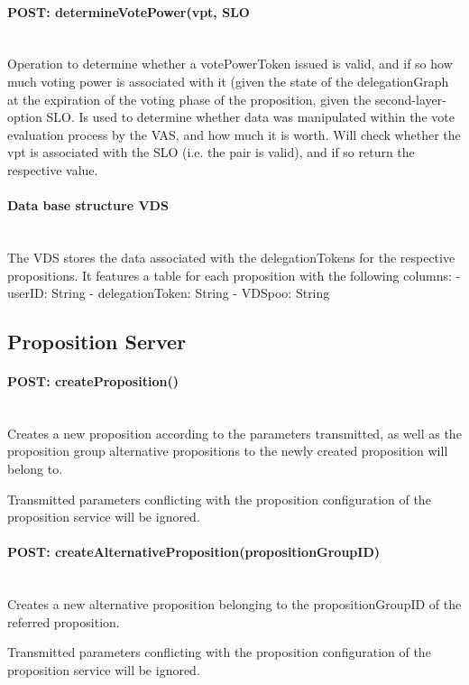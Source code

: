 \paragraph*{POST: determineVotePower(vpt, SLO} \mbox{} \\
Operation to determine whether a votePowerToken issued is valid, and if so how much voting power is associated with it (given the state of the delegationGraph at the expiration of the voting phase of the proposition, given the second-layer-option SLO. Is used to determine whether data was manipulated within the vote evaluation process by the VAS, and how much it is worth. Will check whether the vpt is associated with the SLO (i.e. the pair is valid), and if so return the respective value.

\paragraph*{Data base structure VDS} \mbox{} \\
The VDS stores the data associated with the delegationTokens for the respective propositions. It features a table for each proposition with the following columns:
 - userID: String
 - delegationToken: String
 - VDSpoo: String

\subsection{Proposition Server}

\paragraph*{POST: createProposition()} \mbox{} \\
Creates a new proposition according to the parameters transmitted, as well as the proposition group alternative propositions to the newly created proposition will belong to.

Transmitted parameters conflicting with the proposition configuration of the proposition service will be ignored.

\paragraph*{POST: createAlternativeProposition(propositionGroupID)} \mbox{} \\
Creates a new alternative proposition belonging to the propositionGroupID of the referred proposition.

Transmitted parameters conflicting with the proposition configuration of the proposition service will be ignored.

